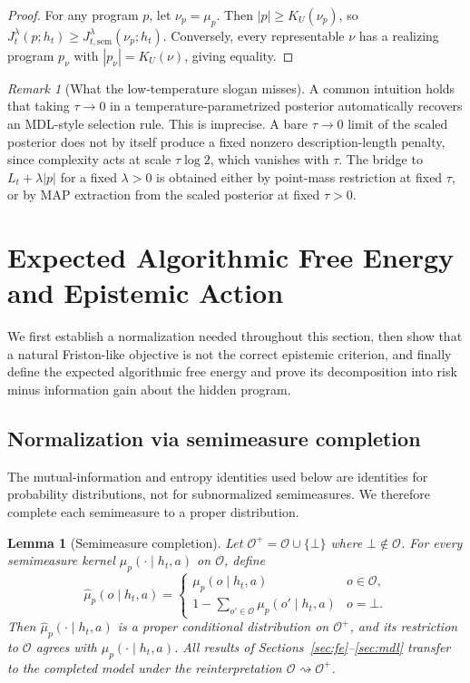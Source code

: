 \documentclass[11pt]{article}
\newtheorem{lemma}[definition]{Lemma}
\theoremstyle{remark}
\newtheorem{remark}[definition]{Remark}
\newcommand{\Ocal}{\mathcal{O}}
\begin{document}
\begin{proof}
For any program \(p\), let \(\nu_p=\mu_p\). Then \(|p|\ge K_U(\nu_p)\), so \(J_t^\lambda(p;h_t)\ge J_{t,\mathrm{sem}}^\lambda(\nu_p;h_t)\). Conversely, every representable \(\nu\) has a realizing program \(p_\nu\) with \(|p_\nu|=K_U(\nu)\), giving equality.
\end{proof}

\begin{remark}[What the low-temperature slogan misses]
A common intuition holds that taking \(\tau \to 0\) in a temperature-parametrized posterior automatically recovers an MDL-style selection rule. This is imprecise. A bare \(\tau \to 0\) limit of the scaled posterior does not by itself produce a fixed nonzero description-length penalty, since complexity acts at scale \(\tau\log 2\), which vanishes with \(\tau\). The bridge to \(L_t+\lambda|p|\) for a fixed \(\lambda > 0\) is obtained either by point-mass restriction at fixed \(\tau\), or by MAP extraction from the scaled posterior at fixed \(\tau > 0\).
\end{remark}

\section{Expected Algorithmic Free Energy and Epistemic Action}
\label{sec:action}

We first establish a normalization needed throughout this section, then show that a natural Friston-like objective is not the correct epistemic criterion, and finally define the expected algorithmic free energy and prove its decomposition into risk minus information gain about the hidden program.

\subsection{Normalization via semimeasure completion}

The mutual-information and entropy identities used below are identities for probability distributions, not for subnormalized semimeasures. We therefore complete each semimeasure to a proper distribution.

\begin{lemma}[Semimeasure completion]
\label{lem:completion}
Let \(\Ocal^+ = \Ocal \cup \{\bot\}\) where \(\bot \notin \Ocal\). For every semimeasure kernel \(\mu_p(\cdot\mid h_t,a)\) on \(\Ocal\), define
\[
\hat\mu_p(o \mid h_t, a) =
\begin{cases}
\mu_p(o \mid h_t, a) & o \in \Ocal,\\
1 - \sum_{o' \in \Ocal} \mu_p(o'\mid h_t, a) & o = \bot.
\end{cases}
\]
Then \(\hat\mu_p(\cdot\mid h_t,a)\) is a proper conditional distribution on \(\Ocal^+\), and its restriction to \(\Ocal\) agrees with \(\mu_p(\cdot\mid h_t,a)\). All results of Sections~\ref{sec:fe}--\ref{sec:mdl} transfer to the completed model under the reinterpretation \(\Ocal \rightsquigarrow \Ocal^+\).
\end{lemma}
\end{document}
